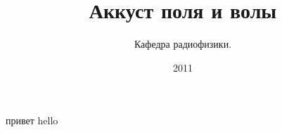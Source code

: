\documentclass[a4paper,11pt,twocolumn,oneside]{book}
\author{Кафедра радиофизики.}
\title{Аккуст поля и волы}
\date{2011}
\begin{document}
привет hello
\end{document}
